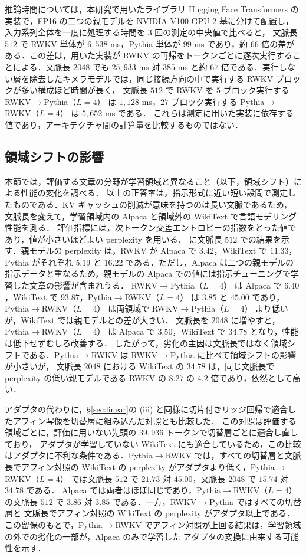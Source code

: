 \documentclass[techrep,noauthor]{ipsj}
\newcommand{\RtoP}{RWKV$\to$\allowbreak Pythia}
\newcommand{\PtoR}{Pythia$\to$\allowbreak RWKV}
\newcommand{\RtoPL}[1]{\RtoP{}（$L{=}#1$）}
\newcommand{\PtoRL}[1]{\PtoR{}（$L{=}#1$）}
\begin{document}
推論時間については，本研究で用いたライブラリ Hugging Face Transformers の実装で，FP16 の二つの親モデルを NVIDIA V100 GPU $2$ 基に分けて配置し，
入力系列全体を一度に処理する時間を $3$ 回の測定の中央値で比べると，
文脈長 $512$ で RWKV 単体が $6{,}538$ ms，Pythia 単体が $99$ ms であり，約 $66$ 倍の差がある．この差は，用いた実装が RWKV の再帰をトークンごとに逐次実行することによる．文脈長 $2048$ でも
$25{,}933$ ms 対 $385$ ms と約 $67$ 倍である．実行しない層を除去したキメラモデルでは，同じ接続方向の中で実行する RWKV ブロックが多い構成ほど時間が長く，
文脈長 $512$ で RWKV を $5$ ブロック実行する \RtoPL{4} は $1{,}128$ ms，$27$ ブロック実行する \PtoRL{4} は $5{,}652$ ms である．
これらは測定に用いた実装に依存する値であり，アーキテクチャ間の計算量を比較するものではない．

\subsection{領域シフトの影響}\label{sec:domain}
本節では，評価する文章の分野が学習領域と異なること（以下，領域シフト）による性能の変化を調べる．
以上の正答率は，指示形式に近い短い設問で測定したものである．KV キャッシュの削減が意味を持つのは長い文脈であるため，
文脈長を変えて，学習領域内の Alpaca と領域外の WikiText で言語モデリング性能を測る．
評価指標には，次トークン交差エントロピーの指数をとった値であり，値が小さいほどよい perplexity を用いる．
 に文脈長 $512$ での結果を示す．親モデルの perplexity は，RWKV が Alpaca で $3.42$，WikiText で $11.33$，Pythia がそれぞれ $5.19$ と $16.22$ である．ただし，Alpaca は二つの親モデルの指示データと重なるため，親モデルの Alpaca での値には指示チューニングで学習した文章の影響が含まれうる．
\RtoPL{4} は Alpaca で $6.40$，WikiText で $93.87$，\PtoRL{4} は $3.85$ と $45.00$ であり，\PtoRL{4} は両領域で \RtoPL{4} より低いが，WikiText では親モデルとの差が大きい．
文脈長を $2048$ に増やすと，\PtoRL{4} は Alpaca で $3.50$，WikiText で $34.78$ となり，性能は低下せずむしろ改善する．
したがって，劣化の主因は文脈長ではなく領域シフトである．\PtoR{} は \RtoP{} に比べて領域シフトの影響が小さいが，
文脈長 $2048$ における WikiText の $34.78$ は，同じ文脈長で perplexity の低い親モデルである RWKV の $8.27$ の $4.2$ 倍であり，依然として高い．

アダプタの代わりに，\S\ref{sec:linear}の (iii) と同様に切片付きリッジ回帰で適合したアフィン写像を切替層に組み込んだ対照とも比較した．
この対照は評価する領域ごとに，評価に用いない先頭の $39{,}936$ トークンで切替層ごとに適合し直しており，
アダプタが学習していない WikiText にも適合しているため，この比較はアダプタに不利な条件である．\PtoR{} では，すべての切替層と文脈長でアフィン対照の WikiText の
perplexity がアダプタより低く，\PtoRL{4} では文脈長 $512$ で $21.73$ 対 $45.00$，文脈長 $2048$ で $15.74$ 対 $34.78$ である．
Alpaca では両者はほぼ同じであり，\PtoRL{4} の文脈長 $512$ で $3.86$ 対 $3.85$ である．一方，\RtoP{} ではすべての切替層と
文脈長でアフィン対照の WikiText の perplexity がアダプタ以上である．この留保のもとで，\PtoR{} でアフィン対照が上回る結果は，学習領域の外での劣化の一部が，Alpaca のみで学習した
アダプタの変換に由来する可能性を示す．
\end{document}

